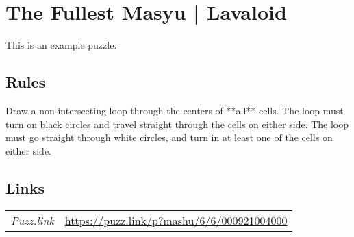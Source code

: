 
\section[The Fullest Masyu | Lavaloid {[\emph{Masyu (Full)}]}]{The Fullest Masyu | {\normalfont Lavaloid}}
\label{sec:01-x-knight-myshoggoth}

This is an example puzzle.

\subsection*{Rules}
\begin{markdown}
Draw a non-intersecting loop through the centers of **all** cells. The loop must turn on black circles and travel straight through the cells on either side. The loop must go straight through white circles, and turn in at least one of the cells on either side.
\end{markdown}
\subsection*{Links}
\begin{tabularx}{\textwidth}{l X}
\emph{Puzz.link} & \url{https://puzz.link/p?mashu/6/6/000921004000} \\
\end{tabularx}
\pagebreak
